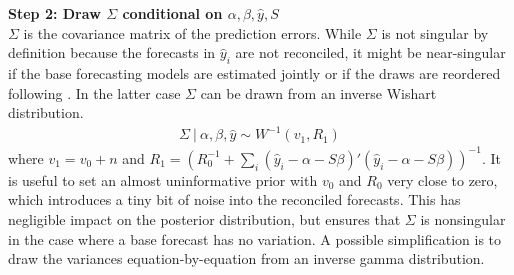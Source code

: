 \documentclass[a4paper,fleqn,11pt]{article}
\begin{document}
\noindent\textbf{Step 2: Draw $\Sigma$ conditional on $\alpha,\beta,\hat{y},S$}\\
$\Sigma$ is the covariance matrix of the prediction errors. While $\Sigma$ is not singular by definition because the forecasts in $\hat{y}_{i}$ are not reconciled, it might be near-singular if the base forecasting models are estimated jointly or if the draws are reordered following \cite{Jeon2018}. In the latter case $\Sigma$ can be drawn from an inverse Wishart distribution.
\begin{align}
\Sigma\ |\ \alpha,\beta,\hat{y} \sim W^{-1}(v_1,R_1)
\end{align}
where $v_1 = v_0 + n$ and $R_1 =  \left( R_0^{-1} + \sum_i (\hat{y}_i - \alpha - S \beta)'(\hat{y}_i - \alpha - S \beta) \right)^{-1}$. It is useful to set an almost uninformative prior with $v_0$ and $R_0$ very close to zero, which introduces a tiny bit of noise into the reconciled forecasts. This has negligible impact on the posterior distribution, but ensures that $\Sigma$ is nonsingular in the case where a base forecast has no variation. A possible simplification is to draw the variances equation-by-equation from an inverse gamma distribution.\\
\end{document}
